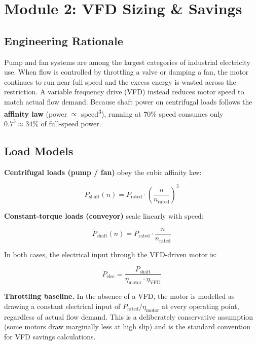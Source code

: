 \documentclass[11pt,a4paper]{article}
\begin{document}
\section{Module 2: VFD Sizing \& Savings}
\label{sec:module2}

\subsection{Engineering Rationale}

Pump and fan systems are among the largest categories of industrial
electricity use. When flow is controlled by throttling a valve or damping a
fan, the motor continues to run near full speed and the excess energy is
wasted across the restriction. A variable frequency drive (VFD) instead
reduces motor speed to match actual flow demand. Because shaft power on
centrifugal loads follows the \textbf{affinity law} (power $\propto$
speed\textsuperscript{3}), running at 70\% speed consumes only $0.7^3
\approx 34\%$ of full-speed power.

\subsection{Load Models}

\textbf{Centrifugal loads (pump / fan)} obey the cubic affinity law:

\begin{equation}
P_{\mathrm{shaft}}(n) = P_{\mathrm{rated}} \cdot \left(\frac{n}{n_{\mathrm{rated}}}\right)^3
\end{equation}

\textbf{Constant-torque loads (conveyor)} scale linearly with speed:

\begin{equation}
P_{\mathrm{shaft}}(n) = P_{\mathrm{rated}} \cdot \frac{n}{n_{\mathrm{rated}}}
\end{equation}

In both cases, the electrical input through the VFD-driven motor is:

\begin{equation}
P_{\mathrm{elec}} = \frac{P_{\mathrm{shaft}}}{\eta_{\mathrm{motor}} \cdot \eta_{\mathrm{VFD}}}
\end{equation}

\textbf{Throttling baseline.} In the absence of a VFD, the motor is modelled
as drawing a constant electrical input of $P_{\mathrm{rated}} /
\eta_{\mathrm{motor}}$ at every operating point, regardless of actual flow
demand. This is a deliberately conservative assumption (some motors draw
marginally less at high slip) and is the standard convention for VFD savings
calculations.
\end{document}
